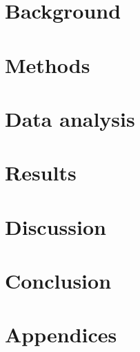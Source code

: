 

\chapter{Background}




%



\chapter{Methods}


\chapter{Data analysis}

\chapter{Results}

\chapter{Discussion}

\chapter{Conclusion}

\printbibliography

\chapter{Appendices}

\begin{appendices}

\end{appendices}


